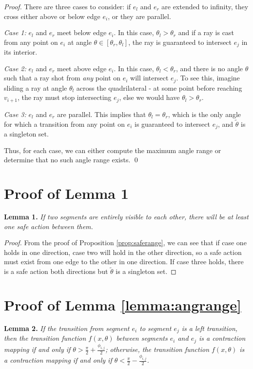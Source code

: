 \documentclass[]{styles/svproc}  %
\begin{document}
\begin{appendix}
\begin{proof}
There are three cases to consider: if $e_l$ and $e_r$ are extended to infinity,
they cross either above or below edge $e_i$, or they are parallel.

\emph{Case 1:} $e_l$ and $e_r$ meet below edge $e_i$. In this case,
$\theta_l > \theta_r$ and if a ray is cast from any point on $e_i$ at angle
$\theta \in [\theta_r, \theta_l]$, the ray is guaranteed to intersect $e_j$ in its
interior.

\emph{Case 2:} $e_l$ and $e_r$ meet above edge $e_i$. In this case, $\theta_l <
\theta_r$, and there is no angle
$\theta$ such that a ray shot from \emph{any} point on $e_i$ will intersect
$e_j$.
To see this, imagine sliding a ray at angle $\theta_l$ across the quadrilateral
- at some point before reaching $v_{i+1}$, the ray must stop intersecting $e_j$,
else we would have $\theta_l > \theta_r$.

\emph{Case 3:} $e_l$ and $e_r$ are parallel. This implies that $\theta_{l} =
\theta_{r}$, which is the only angle for which a transition from any
point on $e_i$ is guaranteed to intersect $e_j$, and $\tilde{\theta}$ is a
singleton set.

Thus, for each case, we can either compute the maximum angle range or determine
that no such angle range exists.
\qed

\end{proof}

\section{Proof of Lemma 1}

\textbf{Lemma 1.} {\em
If two segments are entirely visible to each other, there will be at least one safe
action between them.}

\begin{proof}
From the proof of Proposition \ref{prop:saferange}, we can see that if case one
holds in one direction, case two will hold in the other direction, so a safe
action must exist from one edge to the other in one direction. If case three
holds, there is a safe action both directions but $\tilde{\theta}$ is a
singleton set.
\end{proof}
\section{Proof of Lemma \ref{lemma:angrange}}

\textbf{Lemma 2.} {\em
If the transition from segment $e_i$ to segment $e_j$ is a left transition, then the
transition function $f(x, \theta)$ between segments $e_i$ and $e_j$ is a contraction
mapping if and only if $\theta > \frac{\pi}{2}+\frac{\phi_{i, j}}{2}$;
otherwise, the transition function $f(x, \theta)$ is a contraction mapping if
and only if $\theta < \frac{\pi}{2}-\frac{\phi_{i, j}}{2}$.}


\end{appendix}
\end{document}

